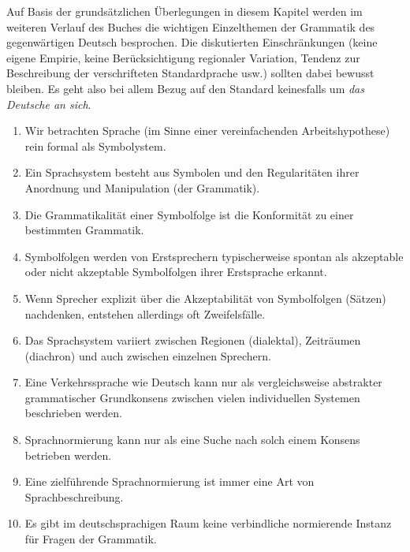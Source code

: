 Auf Basis der grundsätzlichen Überlegungen in diesem Kapitel werden im weiteren Verlauf des Buches die wichtigen Einzelthemen der Grammatik des gegenwärtigen Deutsch besprochen.
Die diskutierten Einschränkungen (keine eigene Empirie, keine Berücksichtigung regionaler Variation, Tendenz zur Beschreibung der verschrifteten Standardprache usw.) sollten dabei bewusst bleiben.
Es geht also bei allem Bezug auf den Standard keinesfalls um \textit{das Deutsche an sich}.

\Zusammenfassung

\begin{enumerate}
  \item Wir betrachten Sprache (im Sinne einer vereinfachenden Arbeitshypothese) rein formal als Symbolystem.
  \item Ein Sprachsystem besteht aus Symbolen und den Regularitäten ihrer Anordnung und Manipulation (der Grammatik).
  \item Die Grammatikalität einer Symbolfolge ist die Konformität zu einer bestimmten Grammatik.
  \item Symbolfolgen werden von Erstsprechern typischerweise spontan als akzeptable oder nicht akzeptable Symbolfolgen ihrer Erstsprache erkannt.
  \item Wenn Sprecher explizit über die Akzeptabilität von Symbolfolgen (\zB Sätzen) nachdenken, entstehen allerdings oft Zweifelsfälle.
  \item Das Sprachsystem variiert zwischen Regionen (dialektal), Zeiträumen (diachron) und auch zwischen einzelnen Sprechern.
  \item Eine Verkehrssprache wie Deutsch kann nur als vergleichsweise abstrakter grammatischer Grundkonsens zwischen vielen individuellen Systemen beschrieben werden.
  \item Sprachnormierung kann nur als eine Suche nach solch einem Konsens betrieben werden.
  \item Eine zielführende Sprachnormierung ist immer eine Art von Sprachbeschreibung.
  \item Es gibt im deutschsprachigen Raum keine verbindliche normierende Instanz für Fragen der Grammatik.
\end{enumerate}
